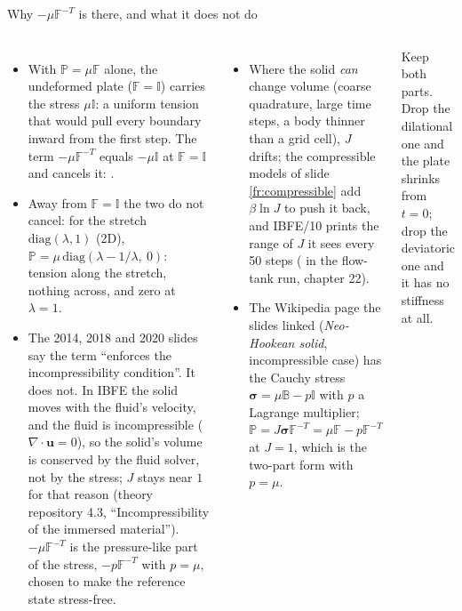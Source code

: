 \documentclass[aspectratio=169,11pt]{beamer}
\begin{document}
\begin{frame}{Why $-\mu\mathbb{F}^{-T}$ is there, and what it does not do}
\label{fr:dil}
\scriptsize
\begin{columns}[T]
\begin{itemize}
  \item With $\mathbb{P} = \mu\mathbb{F}$ alone, the undeformed plate ($\mathbb{F} = \mathbb{I}$) carries the stress $\mu\mathbb{I}$: a uniform tension that would pull every boundary inward from the first step. The term $-\mu\mathbb{F}^{-T}$ equals $-\mu\mathbb{I}$ at $\mathbb{F} = \mathbb{I}$ and cancels it: .
  \item Away from $\mathbb{F} = \mathbb{I}$ the two do not cancel: for the stretch $\mathrm{diag}(\lambda, 1)$ (2D), $\mathbb{P} = \mu\,\mathrm{diag}(\lambda - 1/\lambda,\ 0)$: tension along the stretch, nothing across, and zero at $\lambda = 1$.
  \item The 2014, 2018 and 2020 slides say the term ``enforces the incompressibility condition''. It does not. In IBFE the solid moves with the fluid's velocity, and the fluid is incompressible ($\nabla\cdot\mathbf{u} = 0$), so the solid's volume is conserved by the fluid solver, not by the stress; $J$ stays near $1$ for that reason (theory repository 4.3, ``Incompressibility of the immersed material''). $-\mu\mathbb{F}^{-T}$ is the pressure-like part of the stress, $-p\mathbb{F}^{-T}$ with $p = \mu$, chosen to make the reference state stress-free.
\end{itemize}
\begin{itemize}
  \item Where the solid \emph{can} change volume (coarse quadrature, large time steps, a body thinner than a grid cell), $J$ drifts; the compressible models of slide \ref{fr:compressible} add $\beta\ln J$ to push it back, and IBFE/10 prints the range of $J$ it sees every 50 steps ( in the flow-tank run, chapter 22).
  \item The Wikipedia page the slides linked (\emph{Neo-Hookean solid}, incompressible case) has the Cauchy stress $\boldsymbol{\sigma} = \mu\mathbb{B} - p\mathbb{I}$ with $p$ a Lagrange multiplier; $\mathbb{P} = J\boldsymbol{\sigma}\mathbb{F}^{-T} = \mu\mathbb{F} - p\mathbb{F}^{-T}$ at $J = 1$, which is the two-part form with $p = \mu$.
\end{itemize}
\begin{punchbox}
\footnotesize Keep both parts. Drop the dilational one and the plate shrinks from $t = 0$; drop the deviatoric one and it has no stiffness at all.
\end{punchbox}
\end{columns}
\end{frame}
\end{document}
